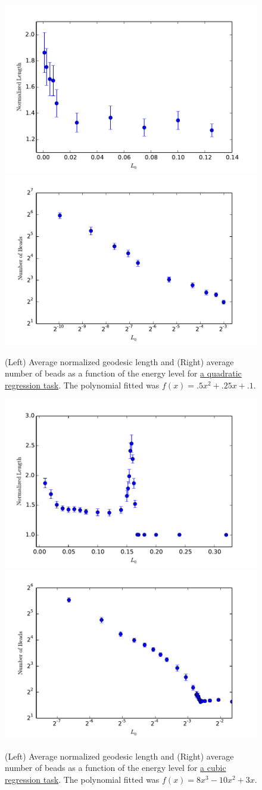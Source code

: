 \begin{figure}
\label{QUADRATICSfigs}
\centering
\includegraphics[width=.4\textwidth]{../Plots/normlengthquadratics}
\includegraphics[width=.4\textwidth]{../Plots/numbeadsquadratics}
\caption{(Left) Average normalized geodesic length and (Right) average number of beads as a function of the energy level for \href{github.com/danielfreeman11/convex-nets/tree/master/LaunchScripts/QUADRATIC.ipynb}{a quadratic regression task}.  The polynomial fitted was $f(x) = .5x^2 + .25x + .1$.}
\end{figure}
 
 
 \begin{figure}
\label{CUBICSfigs}
\centering
\includegraphics[width=.4\textwidth]{../Plots/normlengthcubics}
\includegraphics[width=.4\textwidth]{../Plots/numbeadscubics}
\caption{(Left) Average normalized geodesic length and (Right) average number of beads as a function of the energy level for \href{github.com/danielfreeman11/convex-nets/tree/master/LaunchScripts/CUBIC.ipynb}{a cubic regression task}.  The polynomial fitted was $f(x) = 8x^3 - 10x^2 + 3x$.}
\end{figure}

